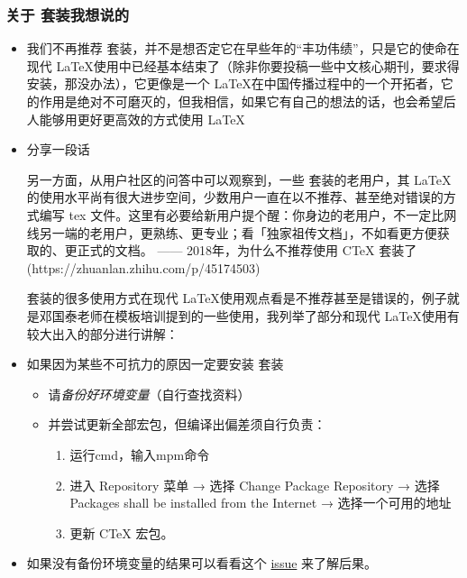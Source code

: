 \subsubsection{关于 \CTeX 套装我想说的}

\begin{itemize}
  \item 我们不再推荐 \CTeX 套装，并不是想否定它在早些年的“丰功伟绩”，只是它的使命在现代 \LaTeX 使用中已经基本结束了（除非你要投稿一些中文核心期刊，要求得安装，那没办法），它更像是一个 \LaTeX 在中国传播过程中的一个开拓者，它的作用是绝对不可磨灭的，但我相信，如果它有自己的想法的话，也会希望后人能够用更好更高效的方式使用 \LaTeX
  
  \item 分享一段话
    \begin{latexexample}[gobble = 6]
      另一方面，从用户社区的问答中可以观察到，一些 \CTeX 套装的老用户，其 LaTeX 的使用水平尚有很大进步空间，少数用户一直在以不推荐、甚至绝对错误的方式编写 tex 文件。这里有必要给新用户提个醒：你身边的老用户，不一定比网线另一端的老用户，更熟练、更专业；看「独家祖传文档」，不如看更方便获取的、更正式的文档。
      —— 2018年，为什么不推荐使用 CTeX 套装了(https://zhuanlan.zhihu.com/p/45174503)
    \end{latexexample}
  
    \CTeX 套装的很多使用方式在现代 \LaTeX 使用观点看是不推荐甚至是错误的，例子就是邓国泰老师在模板培训提到的一些使用，我列举了部分和现代 \LaTeX 使用有较大出入的部分进行讲解：
  
  \item 如果因为某些不可抗力的原因一定要安装 \CTeX 套装
    \begin{itemize}
      \item 请\emph{备份好环境变量}（自行查找资料）
      \item 并尝试更新全部宏包，但编译出偏差须自行负责：
        \begin{enumerate}
          \item 运行cmd，输入mpm命令
          \item 进入 Repository 菜单 → 选择 Change Package Repository → 选择 Packages shall be installed from the Internet → 选择一个可用的地址
          \item 更新 CTeX 宏包。
        \end{enumerate}
    \end{itemize}
    
  \item 如果没有备份环境变量的结果可以看看这个 \href{https://github.com/CTeX-DEV/CTeX/issues/19}{issue} 来了解后果。
\end{itemize}


